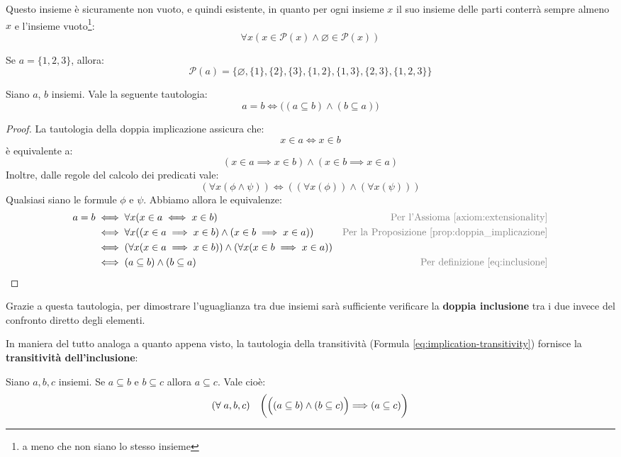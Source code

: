 Questo insieme è sicuramente non vuoto, e quindi esistente, in quanto per ogni insieme $x$ il suo insieme delle parti conterrà sempre almeno $x$ e l'insieme vuoto\footnote{a meno che non siano lo stesso insieme}:
\begin{displaymath}
	\forall x (x \in \mathcal{P}(x) \land \varnothing \in \mathcal{P}(x))
\end{displaymath}

\begin{example}
	Se $a=\{1,2,3\}$, allora:
	$$\mathcal{P}(a)=\{\varnothing,\{1\},\{2\},\{3\},\{1,2\},\{1,3\},\{2,3\},\{1,2,3\}\}$$
\end{example}

\begin{teorbox}
	Siano $a$, $b$ insiemi. Vale la seguente tautologia:
	\begin{equation}\label{eq:doppia_inclusione}
		a=b \iff \bigl((a \subseteq b) \land (b \subseteq a) \bigr)
	\end{equation}
\end{teorbox}

\begin{proof} 
	La tautologia della doppia implicazione assicura che: $$x\in a \iff x \in b$$è equivalente a: $$(x \in a \implies x \in b)\wedge(x\in b \implies x \in a)$$
	Inoltre, dalle regole del calcolo dei predicati vale: $$(\forall x (\phi \wedge \psi)) \iff ((\forall x(\phi)) \wedge (\forall x(\psi)))$$ Qualsiasi siano le formule $\phi$ e $\psi$. Abbiamo allora le equivalenze:
	\begin{align*}
		a=b &\iff  \forall x (x \in a \iff x \in b) & \text{\textcolor{gray}{Per l'Assioma \ref{axiom:extensionality}}}\\
		&\iff  \forall x((x \in a \implies x \in b) \land (x \in b \implies x \in a)) & \text{\textcolor{gray}{Per la Proposizione \ref{prop:doppia_implicazione}}}\\
		& \iff  (\forall x (x \in a \implies x \in b)) \land (\forall x (x \in b \implies x \in a))  \\
		&\iff  (a \subseteq b) \land (b \subseteq a) & \text{\textcolor{gray}{Per definizione \ref{eq:inclusione}}}
	\end{align*}
\end{proof}

\begin{osservation}
	Grazie a questa tautologia, per dimostrare l'uguaglianza tra due insiemi sarà sufficiente verificare la \textbf{doppia inclusione} tra i due invece del confronto diretto degli elementi.
\end{osservation}
In maniera del tutto analoga a quanto appena visto, la tautologia della transitività (Formula \ref{eq:implication-transitivity}) fornisce la \textbf{transitività dell'inclusione}:
\begin{propbox}
Siano $a,b,c$ insiemi. Se $a \subseteq b$ e $b \subseteq c$ allora $a\subseteq c$. Vale cioè:	
\begin{equation}
	(\forall \; a,b,c) \quad \biggl(\Bigl((a \subseteq b) \wedge (b \subseteq c)\Bigr) \Longrightarrow (a \subseteq c)\biggr)
\end{equation}
\end{propbox}

